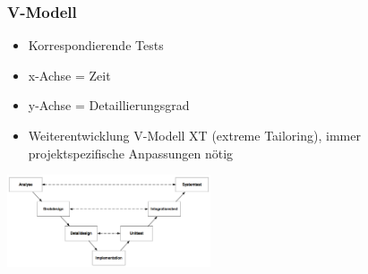 \subsubsection{V-Modell}
\begin{minipage}{10cm}
	\begin{itemize}
		\item Korrespondierende Tests
		\item x-Achse = Zeit
		\item y-Achse = Detaillierungsgrad
		\item Weiterentwicklung V-Modell XT (extreme Tailoring), immer projektspezifische Anpassungen nötig
	\end{itemize}
\end{minipage}
\begin{minipage}{6cm}
	\includegraphics[width=6cm]{images/v_modell.png}	
\end{minipage}


